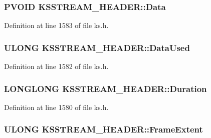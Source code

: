 \subsubsection[{\texorpdfstring{Data}{Data}}]{\setlength{\rightskip}{0pt plus 5cm}P\+V\+O\+ID K\+S\+S\+T\+R\+E\+A\+M\+\_\+\+H\+E\+A\+D\+E\+R\+::\+Data}\hypertarget{struct_k_s_s_t_r_e_a_m___h_e_a_d_e_r_a6f6127c73baaa7e612ffb3337f9024c8}{}\label{struct_k_s_s_t_r_e_a_m___h_e_a_d_e_r_a6f6127c73baaa7e612ffb3337f9024c8}


Definition at line 1583 of file ks.\+h.

\subsubsection[{\texorpdfstring{Data\+Used}{DataUsed}}]{\setlength{\rightskip}{0pt plus 5cm}U\+L\+O\+NG K\+S\+S\+T\+R\+E\+A\+M\+\_\+\+H\+E\+A\+D\+E\+R\+::\+Data\+Used}\hypertarget{struct_k_s_s_t_r_e_a_m___h_e_a_d_e_r_a848c0e966ba8bd1c3545121be62ca3a0}{}\label{struct_k_s_s_t_r_e_a_m___h_e_a_d_e_r_a848c0e966ba8bd1c3545121be62ca3a0}


Definition at line 1582 of file ks.\+h.

\subsubsection[{\texorpdfstring{Duration}{Duration}}]{\setlength{\rightskip}{0pt plus 5cm}L\+O\+N\+G\+L\+O\+NG K\+S\+S\+T\+R\+E\+A\+M\+\_\+\+H\+E\+A\+D\+E\+R\+::\+Duration}\hypertarget{struct_k_s_s_t_r_e_a_m___h_e_a_d_e_r_a85200c653a11bbc54bb73852980b6f5a}{}\label{struct_k_s_s_t_r_e_a_m___h_e_a_d_e_r_a85200c653a11bbc54bb73852980b6f5a}


Definition at line 1580 of file ks.\+h.

\subsubsection[{\texorpdfstring{Frame\+Extent}{FrameExtent}}]{\setlength{\rightskip}{0pt plus 5cm}U\+L\+O\+NG K\+S\+S\+T\+R\+E\+A\+M\+\_\+\+H\+E\+A\+D\+E\+R\+::\+Frame\+Extent}\hypertarget{struct_k_s_s_t_r_e_a_m___h_e_a_d_e_r_a08a3f73cbe6d08bf63ecf08d75ac3a2d}{}\label{struct_k_s_s_t_r_e_a_m___h_e_a_d_e_r_a08a3f73cbe6d08bf63ecf08d75ac3a2d}


